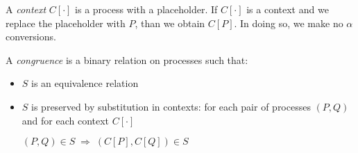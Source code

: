 \begin{definition}
  A \emph{context} $C[\cdot]$ is a process with a placeholder. If $C[\cdot]$ is a context and we replace the placeholder with $P$, than we obtain $C[P]$. In doing so, we make no $\alpha$ conversions.
\end{definition}


\begin{definition}
  A \emph{congruence} is a binary relation on processes such that:
  \begin{itemize}
    \item 
      $S$ is an equivalence relation
    \item 
      $S$ is preserved by substitution in contexts: for each pair of processes $(P, Q)$ and for each context $C[\cdot]$
      \begin{center}
	$(P,Q)\in S\; \Rightarrow\; (C[P], C[Q])\in S$
      \end{center}
  \end{itemize}
\end{definition}

